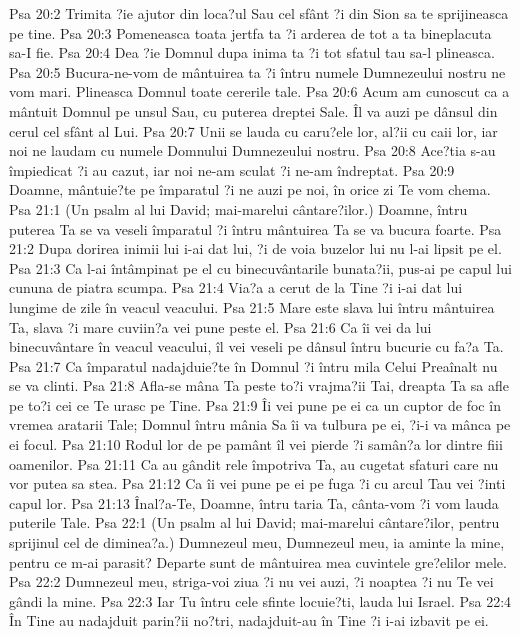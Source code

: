 Psa 20:2  Trimita ?ie ajutor din loca?ul Sau cel sfânt ?i din Sion sa te sprijineasca pe tine.
Psa 20:3  Pomeneasca toata jertfa ta ?i arderea de tot a ta bineplacuta sa-I fie.
Psa 20:4  Dea ?ie Domnul dupa inima ta ?i tot sfatul tau sa-l plineasca.
Psa 20:5  Bucura-ne-vom de mântuirea ta ?i întru numele Dumnezeului nostru ne vom mari. Plineasca Domnul toate cererile tale.
Psa 20:6  Acum am cunoscut ca a mântuit Domnul pe unsul Sau, cu puterea dreptei Sale. Îl va auzi pe dânsul din cerul cel sfânt al Lui.
Psa 20:7  Unii se lauda cu caru?ele lor, al?ii cu caii lor, iar noi ne laudam cu numele Domnului Dumnezeului nostru.
Psa 20:8  Ace?tia s-au împiedicat ?i au cazut, iar noi ne-am sculat ?i ne-am îndreptat.
Psa 20:9  Doamne, mântuie?te pe împaratul ?i ne auzi pe noi, în orice zi Te vom chema.
Psa 21:1  (Un psalm al lui David; mai-marelui cântare?ilor.) Doamne, întru puterea Ta se va veseli împaratul ?i întru mântuirea Ta se va bucura foarte.
Psa 21:2  Dupa dorirea inimii lui i-ai dat lui, ?i de voia buzelor lui nu l-ai lipsit pe el.
Psa 21:3  Ca l-ai întâmpinat pe el cu binecuvântarile bunata?ii, pus-ai pe capul lui cununa de piatra scumpa.
Psa 21:4  Via?a a cerut de la Tine ?i i-ai dat lui lungime de zile în veacul veacului.
Psa 21:5  Mare este slava lui întru mântuirea Ta, slava ?i mare cuviin?a vei pune peste el.
Psa 21:6  Ca îi vei da lui binecuvântare în veacul veacului, îl vei veseli pe dânsul întru bucurie cu fa?a Ta.
Psa 21:7  Ca împaratul nadajduie?te în Domnul ?i întru mila Celui Preaînalt nu se va clinti.
Psa 21:8  Afla-se mâna Ta peste to?i vrajma?ii Tai, dreapta Ta sa afle pe to?i cei ce Te urasc pe Tine.
Psa 21:9  Îi vei pune pe ei ca un cuptor de foc în vremea aratarii Tale; Domnul întru mânia Sa îi va tulbura pe ei, ?i-i va mânca pe ei focul.
Psa 21:10  Rodul lor de pe pamânt îl vei pierde ?i samân?a lor dintre fiii oamenilor.
Psa 21:11  Ca au gândit rele împotriva Ta, au cugetat sfaturi care nu vor putea sa stea.
Psa 21:12  Ca îi vei pune pe ei pe fuga ?i cu arcul Tau vei ?inti capul lor.
Psa 21:13  Înal?a-Te, Doamne, întru taria Ta, cânta-vom ?i vom lauda puterile Tale.
Psa 22:1  (Un psalm al lui David; mai-marelui cântare?ilor, pentru sprijinul cel de diminea?a.) Dumnezeul meu, Dumnezeul meu, ia aminte la mine, pentru ce m-ai parasit? Departe sunt de mântuirea mea cuvintele gre?elilor mele.
Psa 22:2  Dumnezeul meu, striga-voi ziua ?i nu vei auzi, ?i noaptea ?i nu Te vei gândi la mine.
Psa 22:3  Iar Tu întru cele sfinte locuie?ti, lauda lui Israel.
Psa 22:4  În Tine au nadajduit parin?ii no?tri, nadajduit-au în Tine ?i i-ai izbavit pe ei.
